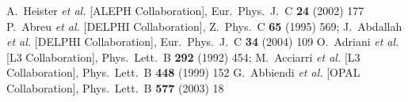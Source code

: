 \documentclass{moriond}
\begin{document}
\begin{thebibliography}{99}
 A.~Heister {\it et al.} [ALEPH Collaboration], Eur.\ Phys.\ J.\ C {\bf 24} (2002) 177
  P.~Abreu {\it et al.} [DELPHI Collaboration],   Z.\ Phys.\ C {\bf 65} (1995) 569;
J.~Abdallah {\it et al.} [DELPHI Collaboration], Eur.\ Phys.\ J.\ C {\bf 34} (2004) 109
 O.~Adriani {\it et al.} [L3 Collaboration], Phys.\ Lett.\ B {\bf 292} (1992) 454;
M.~Acciarri {\it et al.} [L3 Collaboration], Phys.\ Lett.\ B {\bf 448} (1999) 152
  G.~Abbiendi {\it et al.} [OPAL Collaboration],  Phys.\ Lett.\ B {\bf 577} (2003) 18


\end{thebibliography}
\end{document}
